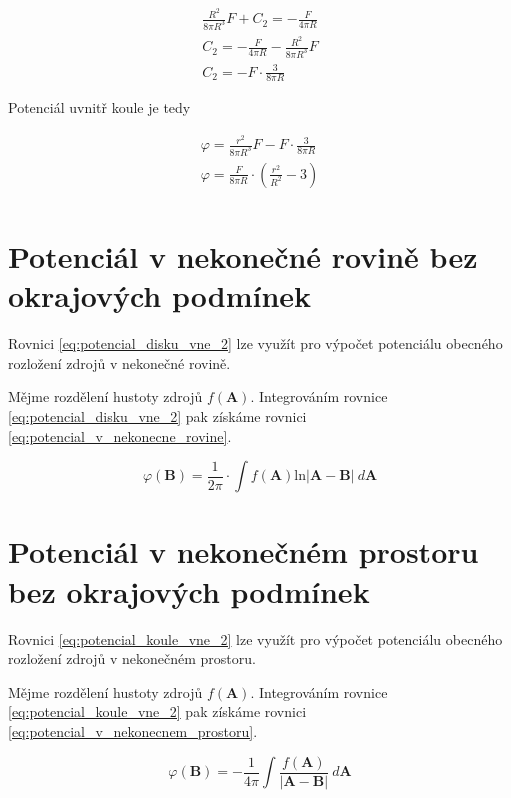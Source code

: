 \documentclass{book}
\newcommand{\vect}[1]{\boldsymbol{#1}}
\begin{document}
\begin{equation}
\begin{split}
\frac{R^2}{8 \pi R^3} F + C_2 = -\frac{F}{4 \pi R} \\
C_2 = -\frac{F}{4 \pi R} - \frac{R^2}{8 \pi R^3} F \\
C_2 = -F \cdot \frac{3}{8 \pi R}
\end{split}
\end{equation}

Potenciál uvnitř koule je tedy

\begin{equation}
\begin{split}
\varphi = \frac{r^2}{8 \pi R^3} F - F \cdot \frac{3}{8 \pi R} \\
\varphi = \frac{F}{8 \pi R} \cdot \left(\frac{r^2}{R^2} - 3 \right) \\
\end{split}
\end{equation}


\section{Potenciál v nekonečné rovině bez okrajových podmínek}

Rovnici \eqref{eq:potencial_disku_vne_2} lze využít pro výpočet potenciálu obecného rozložení zdrojů v nekonečné rovině.

Mějme rozdělení hustoty zdrojů \(f(\vect{A})\). Integrováním rovnice \eqref{eq:potencial_disku_vne_2} pak získáme rovnici \eqref{eq:potencial_v_nekonecne_rovine}.

\begin{equation}
\label{eq:potencial_v_nekonecne_rovine}
\varphi(\vect{B}) = \frac{1}{2 \pi} \cdot \int f(\vect{A}) \mathrm{ln} |\vect{A} - \vect{B}| \ d\vect{A}
\end{equation}

\section{Potenciál v nekonečném prostoru bez okrajových podmínek}

Rovnici \eqref{eq:potencial_koule_vne_2} lze využít pro výpočet potenciálu obecného rozložení zdrojů v nekonečném prostoru.

Mějme rozdělení hustoty zdrojů \(f(\vect{A})\). Integrováním rovnice \eqref{eq:potencial_koule_vne_2} pak získáme rovnici \eqref{eq:potencial_v_nekonecnem_prostoru}.

\begin{equation}
\label{eq:potencial_v_nekonecnem_prostoru}
\varphi(\vect{B}) = -\frac{1}{4 \pi} \int \frac{f(\vect{A})}{|\vect{A} - \vect{B}|} \ d\vect{A}
\end{equation}
\end{document}
